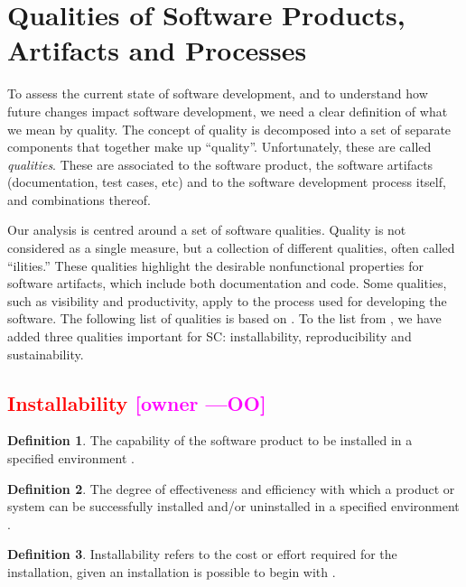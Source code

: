 \documentclass[letterpaper,cleveref]{lipics-v2019}
\newcommand{\authornote}[3]{\textcolor{#1}{[#3 ---#2]}}
\newcommand{\authornote}[3]{}
\newcommand{\oo}[1]{\authornote{magenta}{OO}{#1}} %
\newcommand{\notdone}[1]{\textcolor{red}{#1}}
\theoremstyle{definition}
\newtheorem{defn}{Definition}
\begin{document}
\section{Qualities of Software Products, Artifacts and
	Processes} \label{SecQualities}

To assess the current state of software development, and to understand how
future changes impact software development, we need a clear definition of what
we mean by quality.  The concept of quality is decomposed into a set of separate
components that together make up ``quality''. Unfortunately, these are
called \emph{qualities}. These are associated to the software product,
the software artifacts (documentation, test cases, etc) and to the software
development process itself, and combinations thereof.

Our analysis is centred around a set of software qualities.  Quality is not
considered as a single measure, but a collection of different qualities, often
called ``ilities.''  These qualities highlight the desirable nonfunctional
properties for software artifacts, which include both documentation and
code. Some qualities, such as visibility and productivity, apply to the process
used for developing the software. The following list of qualities is based on
\cite{GhezziEtAl2003}. To the list from \cite{GhezziEtAl2003}, we have added
three qualities important for SC: installability, reproducibility and
sustainability.

\subsection{\notdone{Installability} \oo{owner}}

\begin{defn}
  The capability of the software product to be installed in a specified
  environment \citep{ISO9126}.
\end{defn}

\begin{defn} \label{Installability_Selected2}
	The degree of effectiveness and efficiency with which a product or system can
	be successfully installed and/or uninstalled in a specified environment
	\citep{ISO/IEC25010}.
\end{defn}

\begin{defn} \label{Installability_Selected1} Installability refers to the cost
  or effort required for the installation, given an installation is possible to
  begin with \citep{lenhard2013measuring}.
\end{defn}
\end{document}
